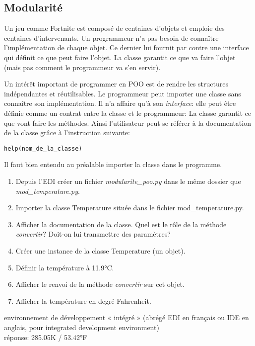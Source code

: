 \documentclass[a4paper,11pt]{article}
\begin{document}
\begin{Form}
\section{Modularité}
\begin{commentprof}
Un jeu comme Fortnite est composé de centaines d'objets et emploie des centaines d'intervenants. Un programmeur n'a pas besoin de connaître l'implémentation de chaque objet. Ce dernier lui fournit par contre une interface qui définit ce que peut faire l'objet. La classe garantit ce que va faire l'objet (mais pas comment le programmeur va s'en servir).
\end{commentprof}
Un intérêt important de programmer en POO est de rendre les structures indépendantes et réutilisables. Le programmeur peut importer une classe sans connaître son implémentation. Il n'a affaire qu'à son \emph{interface}: elle peut être définie comme un contrat entre la classe et le programmeur: La classe garantit ce que vont faire les méthodes.
Ainsi l'utilisateur peut se référer à la documentation de la classe grâce à l'instruction suivante:
\begin{lstlisting}
help(nom_de_la_classe)
\end{lstlisting}
Il faut bien entendu au préalable importer la classe dans le programme.
\begin{activite}
\begin{enumerate}
\item Depuis l'EDI créer un fichier \emph{modularite\_poo.py} dans le même dossier que \emph{mod\_temperature.py}.
\item Importer la classe Temperature située dans le fichier mod\_temperature.py.
\item Afficher la documentation de la classe. Quel est le rôle de la méthode \emph{convertir}? Doit-on lui transmettre des paramètres?
\item Créer une instance de la classe Temperature (un objet).
\item Définir la température à 11.9°C.
\item Afficher le renvoi de la méthode \emph{convertir} sur cet objet.
\item Afficher la température en degré Fahrenheit.
\end{enumerate}
\begin{commentprof}
environnement de développement « intégré » (abrégé EDI en français ou IDE en anglais, pour integrated development environment)\\réponse: 285.05K / 53.42°F
\end{commentprof}
\end{activite}


\end{Form}
\end{document}
